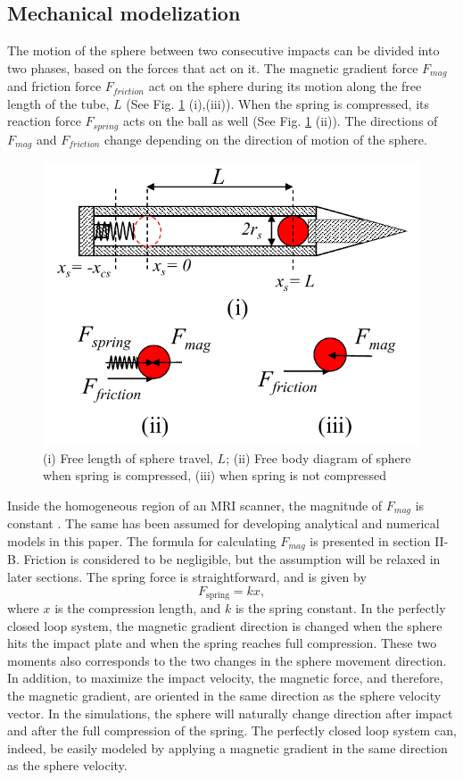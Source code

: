 \documentclass[letterpaper, 10 pt, conference]{ieeeconf}  %
\begin{document}
\subsection{Mechanical modelization}
The motion of the sphere between two consecutive impacts can be divided into two  phases, based on the forces that act on it. The magnetic gradient force $F_{mag}$ and friction force $F_{friction}$ act on the sphere during its motion along the free length of the tube, $L$ (See Fig. \ref{FBD} (i),(iii)). When the spring is compressed, its reaction force $F_{spring}$ acts on the ball as well (See Fig. \ref{FBD} (ii)). The directions of $F_{mag}$ and $F_{friction}$  change depending on the direction of motion of the sphere. 
\begin{figure}
	\includegraphics[width=\linewidth]{FBD_R1.pdf}
	\caption{(i) Free length of sphere travel, $L$; (ii) Free body diagram of sphere when spring is compressed, (iii) when spring is not compressed}
	\label{FBD}
\end{figure}
Inside the homogeneous region of an MRI scanner, the magnitude of $F_{mag}$ is constant \cite{CMR:CMR20163}. The same has been assumed for developing analytical and numerical models in this paper. The formula for calculating $F_{mag}$ is presented in section II-B. Friction is considered to be negligible, but the assumption will be relaxed in later sections. The spring force is straightforward, and is given by
\begin{equation}
F_{\text{spring}}=k x,
\label{spring_force}
\end{equation}
where $x$ is the compression length, and $k$ is the spring constant. In the perfectly closed loop system, the magnetic gradient direction is changed when the sphere hits the impact plate and when the spring reaches full compression. These two moments also corresponds to the two changes in the sphere movement direction. In addition, to maximize the impact velocity, the magnetic force, and therefore, the magnetic gradient, are oriented in the same direction as the sphere velocity vector. In the simulations, the sphere will naturally change direction after impact and after the full compression of the spring. The perfectly closed loop system can, indeed, be easily modeled by applying a magnetic gradient in the same direction as the sphere velocity.
\end{document}
